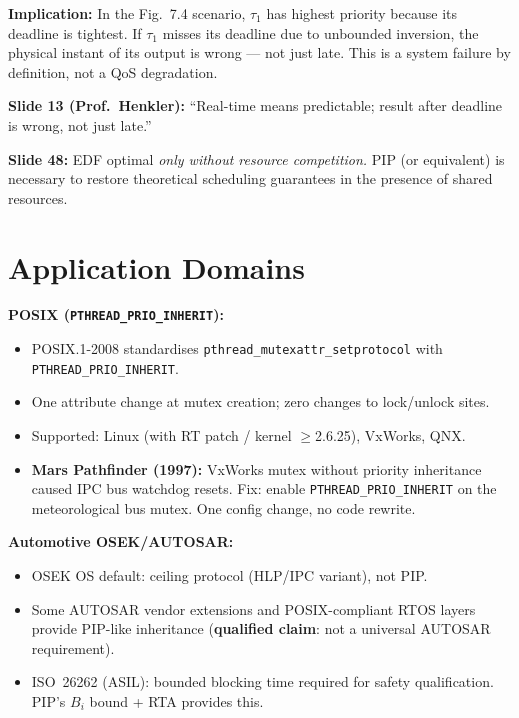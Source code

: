 \documentclass[conference,onecolumn]{IEEEtran}
\begin{document}
\textbf{Implication:}
In the Fig.~7.4 scenario, $\tau_1$ has highest priority because its
deadline is tightest. If $\tau_1$ misses its deadline due to unbounded
inversion, the physical instant of its output is wrong --- not just late.
This is a system failure by definition, not a QoS degradation.

\textbf{Slide 13 (Prof.\ Henkler):} ``Real-time means predictable;
result after deadline is wrong, not just late.''

\textbf{Slide 48:} EDF optimal \emph{only without resource competition.}
PIP (or equivalent) is necessary to restore theoretical scheduling
guarantees in the presence of shared resources.

\section{Application Domains}

\textbf{POSIX (\texttt{PTHREAD\_PRIO\_INHERIT}):}
\begin{itemize}
  \item POSIX.1-2008 standardises \texttt{pthread\_mutexattr\_setprotocol}
        with \texttt{PTHREAD\_PRIO\_INHERIT}.
  \item One attribute change at mutex creation; zero changes to lock/unlock sites.
  \item Supported: Linux (with RT patch / kernel $\geq$2.6.25), VxWorks, QNX.
  \item \textbf{Mars Pathfinder (1997):} VxWorks mutex without priority
        inheritance caused IPC bus watchdog resets. Fix: enable
        \texttt{PTHREAD\_PRIO\_INHERIT} on the meteorological bus mutex.
        One config change, no code rewrite.
\end{itemize}

\textbf{Automotive OSEK/AUTOSAR:}
\begin{itemize}
  \item OSEK OS default: ceiling protocol (HLP/IPC variant), not PIP.
  \item Some AUTOSAR vendor extensions and POSIX-compliant RTOS layers
        provide PIP-like inheritance (\textbf{qualified claim}: not a
        universal AUTOSAR requirement).
  \item ISO~26262 (ASIL): bounded blocking time required for safety
        qualification. PIP's $B_i$ bound + RTA provides this.
\end{itemize}
\end{document}

